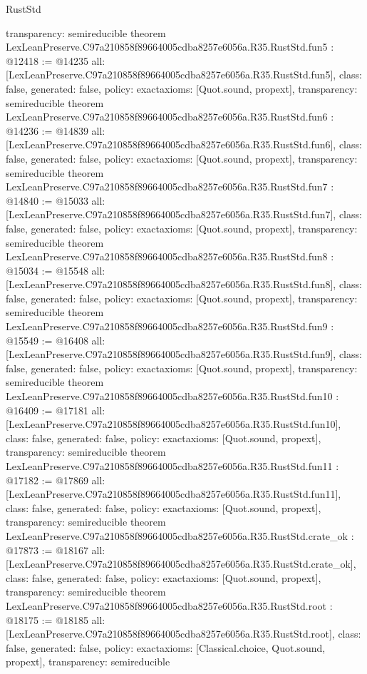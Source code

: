 \begin{lexlean}{RustStd}
\begin{coremodule}
{  transparency: semireducible
}
theorem LexLeanPreserve.C97a210858f89664005cdba8257e6056a.R35.RustStd.fun5 : @12418 := @14235 {
  all: [LexLeanPreserve.C97a210858f89664005cdba8257e6056a.R35.RustStd.fun5],
  class: false,
  generated: false,
  policy: exact{axioms: [Quot.sound, propext]},
  transparency: semireducible
}
theorem LexLeanPreserve.C97a210858f89664005cdba8257e6056a.R35.RustStd.fun6 : @14236 := @14839 {
  all: [LexLeanPreserve.C97a210858f89664005cdba8257e6056a.R35.RustStd.fun6],
  class: false,
  generated: false,
  policy: exact{axioms: [Quot.sound, propext]},
  transparency: semireducible
}
theorem LexLeanPreserve.C97a210858f89664005cdba8257e6056a.R35.RustStd.fun7 : @14840 := @15033 {
  all: [LexLeanPreserve.C97a210858f89664005cdba8257e6056a.R35.RustStd.fun7],
  class: false,
  generated: false,
  policy: exact{axioms: [Quot.sound, propext]},
  transparency: semireducible
}
theorem LexLeanPreserve.C97a210858f89664005cdba8257e6056a.R35.RustStd.fun8 : @15034 := @15548 {
  all: [LexLeanPreserve.C97a210858f89664005cdba8257e6056a.R35.RustStd.fun8],
  class: false,
  generated: false,
  policy: exact{axioms: [Quot.sound, propext]},
  transparency: semireducible
}
theorem LexLeanPreserve.C97a210858f89664005cdba8257e6056a.R35.RustStd.fun9 : @15549 := @16408 {
  all: [LexLeanPreserve.C97a210858f89664005cdba8257e6056a.R35.RustStd.fun9],
  class: false,
  generated: false,
  policy: exact{axioms: [Quot.sound, propext]},
  transparency: semireducible
}
theorem LexLeanPreserve.C97a210858f89664005cdba8257e6056a.R35.RustStd.fun10 : @16409 := @17181 {
  all: [LexLeanPreserve.C97a210858f89664005cdba8257e6056a.R35.RustStd.fun10],
  class: false,
  generated: false,
  policy: exact{axioms: [Quot.sound, propext]},
  transparency: semireducible
}
theorem LexLeanPreserve.C97a210858f89664005cdba8257e6056a.R35.RustStd.fun11 : @17182 := @17869 {
  all: [LexLeanPreserve.C97a210858f89664005cdba8257e6056a.R35.RustStd.fun11],
  class: false,
  generated: false,
  policy: exact{axioms: [Quot.sound, propext]},
  transparency: semireducible
}
theorem LexLeanPreserve.C97a210858f89664005cdba8257e6056a.R35.RustStd.crate_ok : @17873 := @18167 {
  all: [LexLeanPreserve.C97a210858f89664005cdba8257e6056a.R35.RustStd.crate_ok],
  class: false,
  generated: false,
  policy: exact{axioms: [Quot.sound, propext]},
  transparency: semireducible
}
theorem LexLeanPreserve.C97a210858f89664005cdba8257e6056a.R35.RustStd.root : @18175 := @18185 {
  all: [LexLeanPreserve.C97a210858f89664005cdba8257e6056a.R35.RustStd.root],
  class: false,
  generated: false,
  policy: exact{axioms: [Classical.choice, Quot.sound, propext]},
  transparency: semireducible
}


\end{coremodule}
\end{lexlean}

